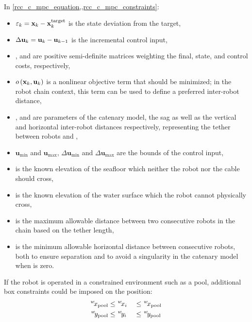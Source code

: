 In \cref{rcc_c_mpc_equation,,rcc_c_mpc_constraints}:
\begin{itemize}
	\item $\res{k} = \ldvect{x}{k} - \llvect{x}{\text{target}}{k}$ is the state deviation from the target,
	\item $\Delta \ldvect{u}{k} = \ldvect{u}{k} - \ldvect{u}{k-1}$ is the incremental control input,
	\item {},  and  are positive semi-definite matrices weighting the final, state, and control costs, respectively,
	\item $o\left(\ldvect{x}{k}, \ldvect{u}{k}\right)$ is a nonlinear objective term that should be minimized; in the robot chain context, this term can be used to define a preferred inter-robot distance,
	\item {},  and  are parameters of the catenary model, the sag as well as the vertical and horizontal inter-robot distances respectively, representing the tether between robots  and ,
	\item $\mathbf{u}_{\text{min}}$ and $\mathbf{u}_{\text{max}}$, $\Delta\mathbf{u}_{\text{min}}$ and $\Delta\mathbf{u}_{\text{max}}$ are the bounds of the control input,
	\item {} is the known elevation of the seafloor which neither the robot nor the cable should cross,
	\item {} is the known elevation of the water surface which the robot cannot physically cross,
	\item {} is the maximum allowable distance between two consecutive robots in the chain based on the tether length,
	\item {} is the minimum allowable horizontal distance between consecutive robots, both to ensure separation and to avoid a singularity in the catenary model when \catl{} is zero.
\end{itemize}

If the robot is operated in a constrained environment such as a pool, additional box constraints
could be imposed on the position:
\begin{alignat}{3}
	\ldcoord{x}{w}{\text{pool}}  \leq & ~\ldcoord{x}{w}{i} & ~\leq & ~\ldcoord{x}{w}{\text{pool}} \nonumber \\
	\ldcoord{y}{w}{\text{pool}}  \leq & ~\ldcoord{y}{w}{i} & ~\leq & ~\ldcoord{y}{w}{\text{pool}}
\end{alignat}

